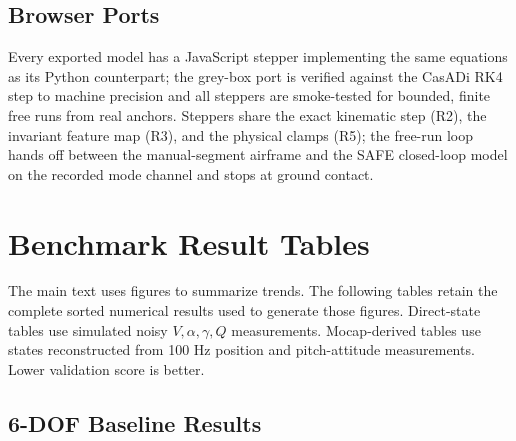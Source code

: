 \documentclass[11pt]{article}
\begin{document}
\subsection{Browser Ports}
Every exported model has a JavaScript stepper implementing the same
equations as its Python counterpart; the grey-box port is verified against
the CasADi RK4 step to machine precision and all steppers are smoke-tested
for bounded, finite free runs from real anchors. Steppers share the exact
kinematic step (R2), the invariant feature map (R3), and the physical
clamps (R5); the free-run loop hands off between the manual-segment
airframe and the SAFE closed-loop model on the recorded mode channel and
stops at ground contact.

\section{Benchmark Result Tables}
\label{app:benchmark_tables}
The main text uses figures to summarize trends. The following tables retain the
complete sorted numerical results used to generate those figures. Direct-state
tables use simulated noisy $V,\alpha,\gamma,Q$ measurements. Mocap-derived
tables use states reconstructed from 100 Hz position and pitch-attitude
measurements. Lower validation score is better.

\subsection{6-DOF Baseline Results}

\end{document}
